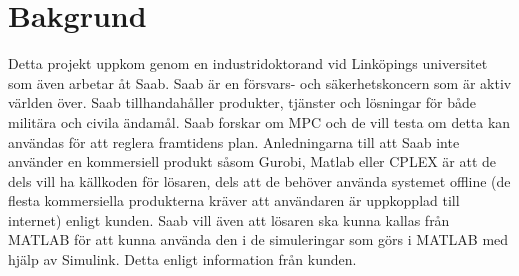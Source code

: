 \section{Bakgrund}    
Detta projekt uppkom genom en industridoktorand vid Linköpings universitet som även arbetar åt Saab. Saab är en försvars- och säkerhetskoncern som är aktiv världen över. Saab tillhandahåller produkter, tjänster och lösningar för både militära och civila ändamål. \citep{SAABbrief}
\newline
\newline
Saab forskar om MPC och de vill testa om detta kan användas för att reglera framtidens plan\citep{danielSimon}.
Anledningarna till att Saab inte använder en kommersiell produkt såsom Gurobi, Matlab eller CPLEX är att de dels vill ha källkoden för lösaren, dels att de behöver använda systemet offline (de flesta kommersiella produkterna kräver att användaren är uppkopplad till internet) enligt kunden.  
\newline
\newline
Saab vill även att lösaren ska kunna kallas från MATLAB för att kunna använda den i de simuleringar som görs i MATLAB med hjälp av Simulink. Detta enligt information från kunden.  
